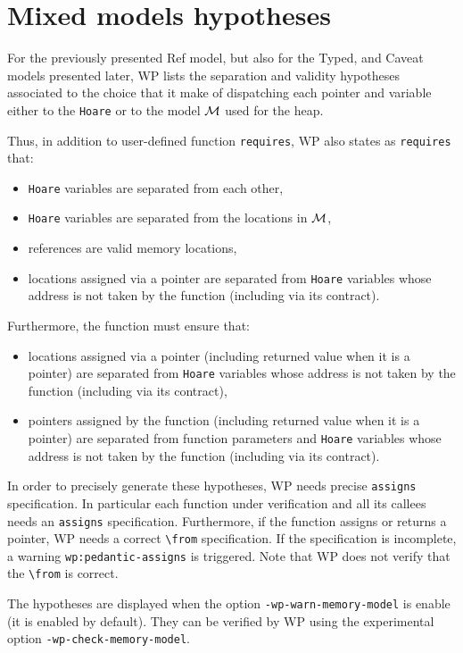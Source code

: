 \section{Mixed models hypotheses}
\label{wp-model-hypotheses}

For the previously presented \textsf{Ref} model, but also for the
\textsf{Typed}, and \textsf{Caveat} models presented later, WP lists
the separation and validity hypotheses associated to the choice that
it make of dispatching each pointer and variable either to the
\lstinline{Hoare} or to the model $\cal{M}$ used for the heap.

Thus, in addition to user-defined function \lstinline{requires}, WP
also states as \lstinline{requires} that:

\begin{itemize}
\item \lstinline{Hoare} variables are separated from each other,
\item \lstinline{Hoare} variables are separated from the locations in $\cal{M}$,
\item references are valid memory locations,
\item locations assigned via a pointer are separated from \lstinline{Hoare}
  variables whose address is not taken by the function (including via
  its contract).
\end{itemize}

Furthermore, the function must ensure that:

\begin{itemize}
\item locations assigned via a pointer (including returned value when
  it is a pointer) are separated from \lstinline{Hoare} variables whose address
  is not taken by the function (including via its contract),
\item pointers assigned by the function (including returned value when
  it is a pointer) are separated from function parameters and \lstinline{Hoare}
  variables whose address is not taken by the function (including via
  its contract).
\end{itemize}

In order to precisely generate these hypotheses, WP needs precise
\lstinline{assigns} specification. In particular each function under
verification and all its callees needs an \lstinline{assigns} specification.
Furthermore, if the function assigns or returns a pointer, WP needs
a correct \lstinline{\from} specification. If the specification is
incomplete, a warning \lstinline{wp:pedantic-assigns} is triggered.
Note that WP does not verify that the \lstinline{\from} is correct.

The hypotheses are displayed when the option
\lstinline{-wp-warn-memory-model} is enable (it is enabled by default).
They can be verified by WP using the experimental option
\lstinline{-wp-check-memory-model}.
